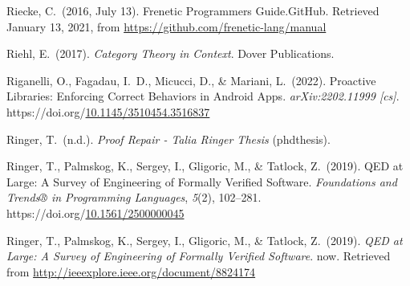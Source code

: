 \documentclass[12pt,twoside]{article}
\begin{document}
{\begin{thebibliography}{1079}
\mdbibitemlabel{}Riecke, C.~(2016, July 13). Frenetic Programmers Guide.GitHub. Retrieved January 13, 2021, from \href{https://github.com/frenetic-lang/manual}{{\ttfamily https://\hspace{0pt}github.\hspace{0pt}com/\hspace{0pt}frenetic-\hspace{0pt}lang/\hspace{0pt}manual}}%

\mdbibitemlabel{}Riehl, E.~(2017). \emph{Category Theory in Context}. Dover Publications.%

\mdbibitemlabel{}Riganelli, O., Fagadau, I.~D., Micucci, D., \& Mariani, L.~(2022). Proactive Libraries: Enforcing Correct Behaviors in Android Apps. \emph{arXiv:2202.11999 {}[cs]}. https://doi.org/\href{https://dx.doi.org/10.1145/3510454.3516837}{10.1145/3510454.3516837}%

\mdbibitemlabel{}Ringer, T.~(n.d.). \emph{Proof Repair - Talia Ringer Thesis} (phdthesis).%

\mdbibitemlabel{}Ringer, T., Palmskog, K., Sergey, I., Gligoric, M., \& Tatlock, Z.~(2019). QED at Large: A Survey of Engineering of Formally Verified Software. \emph{Foundations and Trends® in Programming Languages}, \emph{5}(2), 102–281. https://doi.org/\href{https://dx.doi.org/10.1561/2500000045}{10.1561/2500000045}%

\mdbibitemlabel{}Ringer, T., Palmskog, K., Sergey, I., Gligoric, M., \& Tatlock, Z.~(2019). \emph{QED at Large: A Survey of Engineering of Formally Verified Software}. now. Retrieved from \href{http://ieeexplore.ieee.org/document/8824174}{{\ttfamily http://\hspace{0pt}ieeexplore.\hspace{0pt}ieee.\hspace{0pt}org/\hspace{0pt}document/\hspace{0pt}8824174}}%


\end{thebibliography}}
\end{document}
